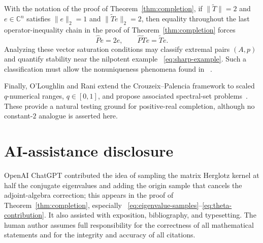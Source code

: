 \documentclass[preprints,article,submit,oneauthor]{Definitions/mdpi}
\theoremstyle{mdpi}
\theoremstyle{definition}
\newcommand{\C}{\mathbb C}
\begin{document}
With the notation of the proof of Theorem~\ref{thm:completion},
if $\lVert\widetilde T\rVert=2$ and $e\in\C^n$ satisfies
$\lVert e\rVert_2=1$ and $\lVert\widetilde Te\rVert_2=2$, then equality
throughout the last
operator-inequality chain in the proof of
Theorem~\ref{thm:completion} forces
\[
  \widehat Pe=2e,
  \qquad
  \widehat P\widetilde Te=\widetilde Te.
\]
Analyzing these vector saturation conditions may classify extremal
pairs $(A,p)$ and quantify stability near the nilpotent example~%
\eqref{eq:sharp-example}.  Such a
classification must allow the nonuniqueness phenomena found in~%
\cite{Li2020}.

Finally, O'Loughlin and Rani extend the Crouzeix--Palencia framework to
scaled $q$-numerical ranges, $q\in[0,1]$, and propose associated
spectral-set problems~\cite{OLoughlinRani2026}.  These provide a natural
testing ground for positive-real completion, although no constant-$2$
analogue is asserted here.

\section*{AI-assistance disclosure}

OpenAI ChatGPT contributed the idea of sampling the matrix Herglotz
kernel at half the conjugate eigenvalues and adding the origin sample
that cancels the adjoint-algebra correction; this appears in the proof
of Theorem~\ref{thm:completion}, especially~%
\eqref{eq:eigenvalue-samples}--\eqref{eq:theta-contribution}.  It also
assisted with exposition, bibliography, and typesetting.  The human
author assumes full responsibility for the correctness of all
mathematical statements and for the integrity and accuracy of all
citations.


\end{document}
